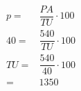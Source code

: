 	\begin{align*}
p={}&\dfrac{PA}{TU}\cdot 100\\
40={}&\dfrac{540}{TU}\cdot 100\\
TU={}&\dfrac{540}{40}\cdot 100\\
={}&\num{1350 }
	\end{align*}
